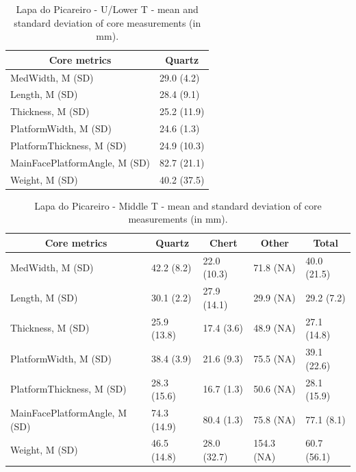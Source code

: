 \documentclass[12pt,twoside]{reedthesis}
\begin{document}
\newpage
\begin{table}

\caption{\label{tab:coremetricsLP1}Lapa do Picareiro - U/Lower T - mean and standard deviation of core measurements (in mm).}
\centering
\fontsize{9}{11}\selectfont
\begin{tabular}[t]{ll}
\toprule
\multicolumn{1}{c}{\textbf{Core metrics}} & \multicolumn{1}{c}{\textbf{Quartz}}\\
\midrule
MedWidth, M (SD) & 29.0 (4.2)\\
Length, M (SD) & 28.4 (9.1)\\
Thickness, M (SD) & 25.2 (11.9)\\
PlatformWidth, M (SD) & 24.6 (1.3)\\
PlatformThickness, M (SD) & 24.9 (10.3)\\
\addlinespace
MainFacePlatformAngle, M (SD) & 82.7 (21.1)\\
Weight, M (SD) & 40.2 (37.5)\\
\bottomrule
\end{tabular}
\end{table}
\begin{table}

\caption{\label{tab:coremetricsLP2}Lapa do Picareiro - Middle T - mean and standard deviation of core measurements (in mm).}
\centering
\fontsize{9}{11}\selectfont
\begin{tabular}[t]{lllll}
\toprule
\multicolumn{1}{c}{\textbf{Core metrics}} & \multicolumn{1}{c}{\textbf{Quartz}} & \multicolumn{1}{c}{\textbf{Chert}} & \multicolumn{1}{c}{\textbf{Other}} & \multicolumn{1}{c}{\textbf{Total}}\\
\midrule
MedWidth, M (SD) & 42.2 (8.2) & 22.0 (10.3) & 71.8 (NA) & 40.0 (21.5)\\
Length, M (SD) & 30.1 (2.2) & 27.9 (14.1) & 29.9 (NA) & 29.2 (7.2)\\
Thickness, M (SD) & 25.9 (13.8) & 17.4 (3.6) & 48.9 (NA) & 27.1 (14.8)\\
PlatformWidth, M (SD) & 38.4 (3.9) & 21.6 (9.3) & 75.5 (NA) & 39.1 (22.6)\\
PlatformThickness, M (SD) & 28.3 (15.6) & 16.7 (1.3) & 50.6 (NA) & 28.1 (15.9)\\
\addlinespace
MainFacePlatformAngle, M (SD) & 74.3 (14.9) & 80.4 (1.3) & 75.8 (NA) & 77.1 (8.1)\\
Weight, M (SD) & 46.5 (14.8) & 28.0 (32.7) & 154.3 (NA) & 60.7 (56.1)\\
\bottomrule
\end{tabular}
\end{table}
\newpage
\end{document}
